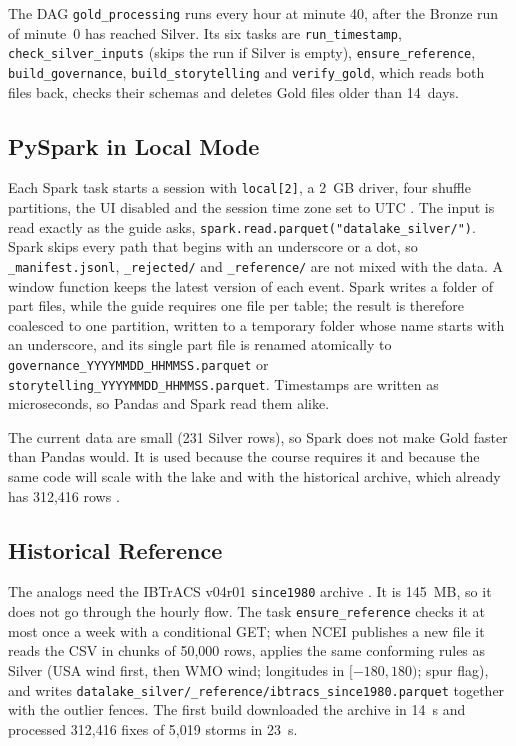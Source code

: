 \documentclass[10pt,twocolumn,letterpaper]{article}
\newcommand{\code}[1]{\texttt{\footnotesize #1}}
\begin{document}
The DAG \code{gold\_processing} runs every hour at minute 40, after the Bronze run of minute~0 has reached Silver. Its six tasks are \code{run\_timestamp}, \code{check\_silver\_inputs} (skips the run if Silver is empty), \code{ensure\_reference}, \code{build\_governance}, \code{build\_storytelling} and \code{verify\_gold}, which reads both files back, checks their schemas and deletes Gold files older than 14~days.

\subsection{PySpark in Local Mode}
Each Spark task starts a session with \code{local[2]}, a 2~GB driver, four shuffle partitions, the UI disabled and the session time zone set to UTC \cite{pyspark}. The input is read exactly as the guide asks, \code{spark.read.parquet("datalake\_silver/")}. Spark skips every path that begins with an underscore or a dot, so \code{\_manifest.jsonl}, \code{\_rejected/} and \code{\_reference/} are not mixed with the data. A window function keeps the latest version of each event. Spark writes a folder of part files, while the guide requires one file per table; the result is therefore coalesced to one partition, written to a temporary folder whose name starts with an underscore, and its single part file is renamed atomically to \code{governance\_YYYYMMDD\_HHMMSS.parquet} or \code{storytelling\_YYYYMMDD\_HHMMSS.parquet}. Timestamps are written as microseconds, so Pandas and Spark read them alike.

The current data are small (231 Silver rows), so Spark does not make Gold faster than Pandas would. It is used because the course requires it and because the same code will scale with the lake and with the historical archive, which already has 312,416 rows \cite{zaharia}.

\subsection{Historical Reference}
The analogs need the IBTrACS v04r01 \code{since1980} archive \cite{ibtracs,knapp}. It is 145~MB, so it does not go through the hourly flow. The task \code{ensure\_reference} checks it at most once a week with a conditional GET; when NCEI publishes a new file it reads the CSV in chunks of 50,000 rows, applies the same conforming rules as Silver (USA wind first, then WMO wind; longitudes in $[-180,180)$; spur flag), and writes \code{datalake\_silver/\_reference/ibtracs\_since1980.parquet} together with the outlier fences. The first build downloaded the archive in 14~s and processed 312,416 fixes of 5,019 storms in 23~s.
\end{document}
